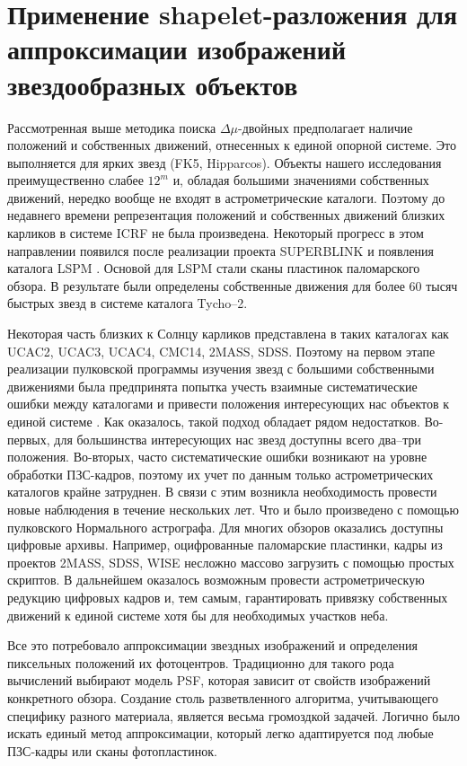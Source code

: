 \chapter{Применение shapelet-разложения для аппроксимации изображений звездообразных объектов} \label{ch:ch2}
Рассмотренная выше методика поиска $\Delta\mu$-двойных предполагает наличие положений и собственных движений, отнесенных к единой опорной системе. Это выполняется для ярких звезд (FK5, Hipparcos). Объекты нашего исследования преимущественно слабее $12^m$ и, обладая большими значениями собственных движений, нередко вообще не входят в астрометрические каталоги. Поэтому до недавнего времени репрезентация положений и собственных движений близких карликов в системе ICRF не была произведена. Некоторый прогресс в этом направлении появился после реализации проекта SUPERBLINK и появления каталога LSPM \cite{2005AJ....129.1483L}. Основой для LSPM стали сканы пластинок паломарского обзора. В результате были определены собственные движения для более 60 тысяч быстрых звезд в системе каталога Tycho--2.

Некоторая часть близких к Солнцу карликов представлена в таких каталогах как UCAC2, UCAC3, UCAC4, CMC14, 2MASS, SDSS. Поэтому на первом этапе реализации пулковской программы изучения звезд с большими собственными движениями была предпринята попытка учесть взаимные систематические ошибки между каталогами и привести положения интересующих нас объектов к единой системе \cite{2011AstL...37..420K}. Как оказалось, такой подход обладает рядом недостатков. Во-первых, для большинства интересующих нас звезд доступны всего два--три положения. Во-вторых, часто систематические ошибки возникают на уровне обработки ПЗС-кадров, поэтому их учет по данным только астрометрических каталогов крайне затруднен. В связи с этим возникла необходимость провести новые наблюдения в течение нескольких лет. Что и было произведено с помощью пулковского Нормального астрографа. Для многих обзоров оказались доступны цифровые архивы. Например, оцифрованные паломарские пластинки, кадры из проектов 2MASS, SDSS, WISE несложно массово загрузить с помощью простых скриптов. В дальнейшем оказалось возможным провести астрометрическую редукцию цифровых кадров и, тем самым, гарантировать привязку собственных движений к единой системе хотя бы для необходимых участков неба.

Все это потребовало аппроксимации звездных изображений и определения пиксельных положений их фотоцентров. Традиционно для такого рода вычислений выбирают модель PSF, которая зависит от свойств изображений конкретного обзора. Создание столь разветвленного алгоритма, учитывающего специфику разного материала, является весьма громоздкой задачей. Логично было искать единый метод аппроксимации, который легко адаптируется под любые ПЗС-кадры или сканы фотопластинок.

